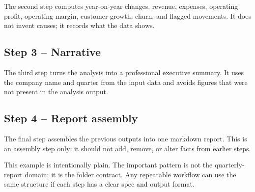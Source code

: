 \documentclass[12pt, a4paper]{article}
\begin{document}
The second step computes year-on-year changes, revenue, expenses, operating profit, operating margin, customer growth, churn, and flagged movements. It does not invent causes; it records what the data shows.

\subsection{Step 3 -- Narrative}

The third step turns the analysis into a professional executive summary. It uses the company name and quarter from the input data and avoids figures that were not present in the analysis output.

\subsection{Step 4 -- Report assembly}

The final step assembles the previous outputs into one markdown report. This is an assembly step only: it should not add, remove, or alter facts from earlier steps.

\begin{notebox}
This example is intentionally plain. The important pattern is not the quarterly-report domain; it is the folder contract. Any repeatable workflow can use the same structure if each step has a clear spec and output format.
\end{notebox}
\end{document}
